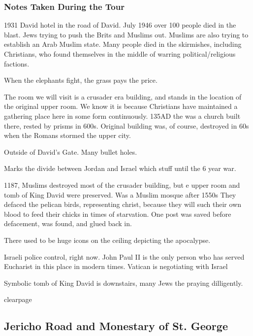 \documentclass[letterpaper]{report}
\begin{document}
\subsubsection{Notes Taken During the Tour}
\begin{multicols}{2}
1931 David hotel in the road of David. July 1946 over 100 people died in the blast. Jews trying to push the Brits and Muslims out. Muslims are also trying to establish an Arab Muslim state. Many people died in the skirmishes, including Christians, who found themselves in the middle of warring political/religious factions.

When the elephants fight, the grass pays the price.

The room we will visit is a crusader era building, and stands in the location of the original upper room. We know it is because Christians have maintained a gathering place here in some form continuously.
135AD the was a church built there, rested by prisms in 600s.
Original building was, of course, destroyed in 60s when the Romans stormed the upper city.

Outside of David's Gate. Many bullet holes.

Marks the divide between Jordan and Israel which stuff until the 6 year war.

1187, Muslims destroyed most of the crusader building, but e upper room and tomb of King David were preserved.
Was a Muslim mosque after 1550s
They defaced the pelican birds, representing christ, because they will such their own blood to feed their chicks in times of starvation.
One post was saved before defacement, was found, and glued back in.

There used to be huge icons on the ceiling depicting the apocalypse.

Israeli police control, right now.
John Paul II is the only person who has served Eucharist in this place in modern times. Vatican is negotiating with Israel

Symbolic tomb of King David is downstairs, many Jews the praying dilligently.

\end{multicols}

clearpage
\subsection{Jericho Road and Monestary of
St. George}
\begin{multicols}{2}
	\mbox{}
\end{multicols}
\end{document}
